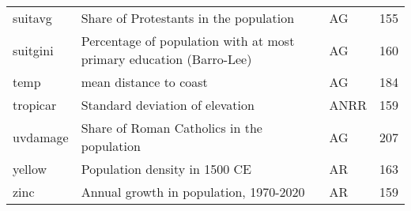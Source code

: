 \begin{tabular}{lllr}
suitavg                        &                                    Share of Protestants in the population &     AG &   155 \\
suitgini                       &       Percentage of population with at most primary education (Barro-Lee) &     AG &   160 \\
temp                           &                                                    mean distance to coast &     AG &   184 \\
tropicar                       &                                           Standard deviation of elevation &   ANRR &   159 \\
uvdamage                       &                                Share of Roman Catholics in the population &     AG &   207 \\
yellow                         &                                             Population density in 1500 CE &     AR &   163 \\
zinc                           &                                    Annual growth in population, 1970-2020 &     AR &   159 \\
\bottomrule
\end{tabular}

